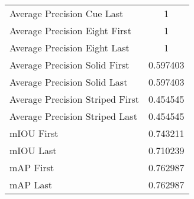 \begin{figure}
\begin{subfigure}[b]{0.49\textwidth}
\begin{tabular}{|l|c|}
        Average Precision Cue Last & 1 \\
        Average Precision Eight First & 1 \\
        Average Precision Eight Last & 1 \\
        Average Precision Solid First & 0.597403 \\
        Average Precision Solid Last & 0.597403 \\
        Average Precision Striped First & 0.454545 \\
        Average Precision Striped Last & 0.454545 \\
        \hline
        mIOU First & 0.743211 \\
        mIOU Last & 0.710239 \\
        mAP First & 0.762987 \\
        mAP Last & 0.762987 \\
        \hline
    \end{tabular}    
\end{subfigure}
\end{figure}

